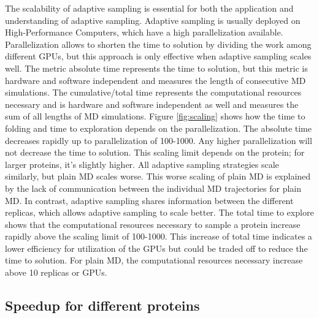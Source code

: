 The scalability of adaptive sampling is essential for both the application and understanding of adaptive sampling. Adaptive sampling is usually deployed on High-Performance Computers, which have a high parallelization available. Parallelization allows to shorten the time to solution by dividing the work among different GPUs, but this approach is only effective when adaptive sampling scales well. The metric absolute time represents the time to solution, but this metric is hardware and software independent and measures the length of consecutive MD simulations. The cumulative/total time represents the computational resources necessary and is hardware and software independent as well and measures the sum of all lengths of MD simulations.
Figure \ref{fig:scaling} shows how the time to folding and time to exploration depends on the parallelization. The absolute time decreases rapidly up to parallelization of 100-1000. Any higher parallelization will not decrease the time to solution. This scaling limit depends on the protein; for larger proteins, it's slightly higher. All adaptive sampling strategies scale similarly, but plain MD scales worse. This worse scaling of plain MD is explained by the lack of communication between the individual MD trajectories for plain MD. In contrast, adaptive sampling shares information between the different replicas, which allows adaptive sampling to scale better. The total time to explore shows that the computational resources necessary to sample a protein increase rapidly above the scaling limit of 100-1000. This increase of total time indicates a lower efficiency for utilization of the GPUs but could be traded off to reduce the time to solution. For plain MD, the computational resources necessary increase above 10 replicas or GPUs.



\subsection{\label{sec:compare}Speedup for different proteins}


